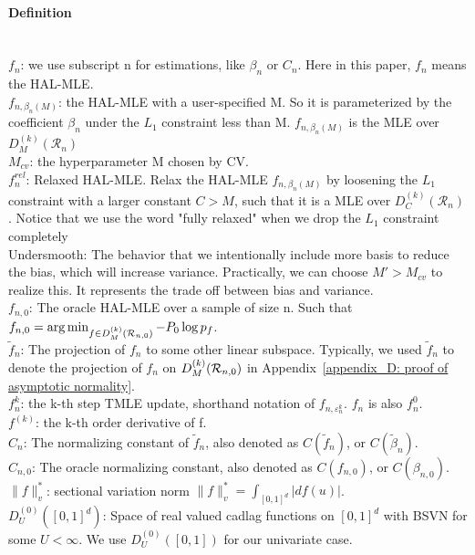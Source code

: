 \paragraph{Definition}~\\
$f_n$: we use subscript n for estimations, like $\beta_n$ or $C_n$. Here in this paper, $f_n$ means the HAL-MLE.\\
$f_{n, \beta_n(M)}$: the HAL-MLE with a user-specified M. So it is parameterized by the coefficient $\beta_n$ under the $L_1$ constraint less than M. $f_{n, \beta_n(M)}$ is the MLE over $D^{(k)}_M(\mathcal{R}_n)$\\
$M_{cv}$: the hyperparameter M chosen by CV.\\
$f_n^{rel}$: Relaxed HAL-MLE. Relax the HAL-MLE $f_{n, \beta_n(M)}$ by loosening the $L_1$ constraint with a larger constant $C > M$, such that it is a MLE over $D^{(k)}_C(\mathcal{R}_n)$. Notice that we use the word "fully relaxed" when we drop the $L_1$ constraint completely \\
Undersmooth: The behavior that we intentionally include more basis to reduce the bias, which will increase variance. Practically, we can choose $M' > M_{cv}$ to realize this. It represents the trade off between bias and variance. \\
$f_{n,0}$: The oracle HAL-MLE over a sample of size n. Such that $f_{n,0}=\arg\min_{f\in D^{(k)}_M({\cal R}_{n,0} )}-P_0 \log p_{f}$. \\
$\tilde f_n$: The projection of $f_n$ to some other linear subspace. Typically, we used $\tilde f_n$ to denote the projection of $f_n$ on $ D^{(k)}_M({\cal R}_{n,0})$ in Appendix~\ref{appendix_D: proof of asymptotic normality}. \\
$f_n^k$: the k-th step TMLE update, shorthand notation of $f_{n, \varepsilon_n^k}$. $f_n$ is also $f_n^0$. \\
$f^{(k)}$: the k-th order derivative of f. \\
$C_n$: The normalizing constant of $\tilde f_n$, also denoted as $C(\tilde f_n)$, or $C(\tilde \beta_n)$. \\
$C_{n,0}$: The oracle normalizing constant, also denoted as $C(f_{n,0})$, or $C(\beta_{n,0})$. \\
$\| f \|_v^*$: sectional variation norm $\| f \|_v^* = \int_{[0,1]^d} | df(u) |$.\\
$D^{(0)}_U([0, 1]^d)$: Space of real valued cadlag functions on $[0, 1]^d$ with BSVN for some $U < \infty$. We use $D^{(0)}_U([0, 1])$ for our univariate case.\\
